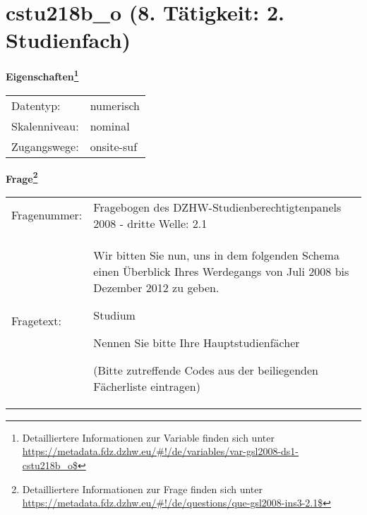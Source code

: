 
    \setcounter{footnote}{0}

    \vspace*{-1.8cm}
	\section{cstu218b\_o (8. Tätigkeit: 2. Studienfach)}
	\label{section:cstu218b_o}



    \vspace*{0.5cm}
    \noindent\textbf{Eigenschaften\footnote{Detailliertere Informationen zur Variable finden sich unter
		\url{https://metadata.fdz.dzhw.eu/\#!/de/variables/var-gsl2008-ds1-cstu218b_o$}}}\\
	\begin{tabularx}{\hsize}{@{}lX}
	Datentyp: & numerisch \\
	Skalenniveau: & nominal \\
	Zugangswege: &
	  onsite-suf
 \\
    \end{tabularx}



				\vspace*{0.5cm}
                \noindent\textbf{Frage\footnote{Detailliertere Informationen zur Frage finden sich unter
		              \url{https://metadata.fdz.dzhw.eu/\#!/de/questions/que-gsl2008-ins3-2.1$}}}\\
				\begin{tabularx}{\hsize}{@{}lX}
					Fragenummer: &
					  Fragebogen des DZHW-Studienberechtigtenpanels 2008 - dritte Welle:
					  2.1
 \\
					Fragetext: & Wir bitten Sie nun, uns in dem folgenden Schema einen Überblick Ihres Werdegangs von Juli 2008 bis Dezember 2012 zu geben.\par  Studium\par  Nennen Sie bitte Ihre Hauptstudienfächer\par  (Bitte zutreffende Codes aus der beiliegenden Fächerliste eintragen) \\
				\end{tabularx}





